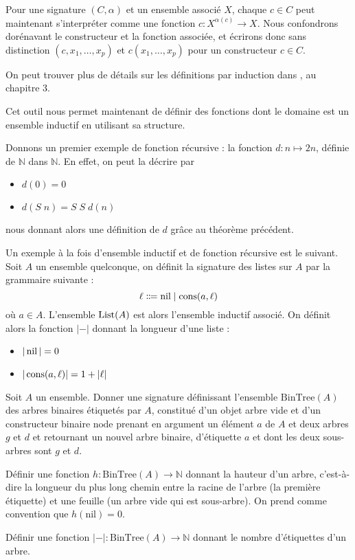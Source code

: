 \begin{remark}
  Pour une signature $(C,\alpha)$ et un ensemble associé $X$, chaque $c\in C$
  peut maintenant s'interpréter comme une fonction $c : X^{\alpha(c)}\to X$. Nous
  confondrons dorénavant le constructeur et la fonction associée, et écrirons
  donc sans distinction $(c,x_1,\ldots,x_p)$ et $c(x_1,\ldots,x_p)$ pour un
  constructeur $c \in C$.
\end{remark}

\begin{remark}
  On peut trouver plus de détails sur les définitions par induction dans
  \cite{winskell1996formal}, au chapitre $3$.
\end{remark}

Cet outil nous permet maintenant de définir des fonctions dont le domaine est
un ensemble inductif en utilisant sa structure.

\begin{example}
  Donnons un premier exemple de fonction récursive : la fonction
  $d :n\mapsto 2n$, définie de $\mathbb N$ dans $\mathbb N$. En effet, on peut
  la décrire par
  \begin{itemize}
  \item $d(0) = 0$
  \item $d(S\;n) = S\;S\;d(n)$
  \end{itemize}
  nous donnant alors une définition de $d$ grâce au théorème précédent.
\end{example}

\begin{example}
  Un exemple à la fois d'ensemble inductif et de fonction récursive est le
  suivant. Soit $A$ un ensemble quelconque, on définit la signature des listes
  sur $A$ par la grammaire suivante :
  \[\ell \Coloneq \nil\mid \cons(a,\ell)\]
  où $a\in A$. L'ensemble $\operatorname{List}(A)$ est alors l'ensemble inductif
  associé. On définit alors la fonction $|-|$ donnant la longueur d'une
  liste :
  \begin{itemize}
  \item $|\operatorname{nil}| = 0$
  \item $|\operatorname{cons}(a,\ell)| = 1 + |\ell|$
  \end{itemize}
\end{example}

\begin{exercise}
  Soit $A$ un ensemble. Donner une signature définissant l'ensemble
  $\mathrm{BinTree}(A)$ des arbres
  binaires étiquetés par $A$, constitué d'un objet arbre vide et d'un
  constructeur binaire $\mathrm{node}$ prenant en argument un élément $a$ de $A$
  et deux arbres $g$ et $d$ et retournant un nouvel arbre binaire, d'étiquette
  $a$ et dont les deux sous-arbres sont $g$ et $d$.

  Définir une fonction $h : \mathrm{BinTree}(A) \to \mathbb N$ donnant la
  hauteur d'un arbre, c'est-à-dire la longueur du plus long chemin entre la
  racine de l'arbre (la première étiquette) et une feuille (un arbre vide qui est
  sous-arbre). On prend comme convention que $h(\mathrm{nil}) = 0$.

  Définir une fonction $|-| : \mathrm{BinTree}(A) \to \mathbb N$ donnant le
  nombre d'étiquettes d'un arbre.
\end{exercise}

